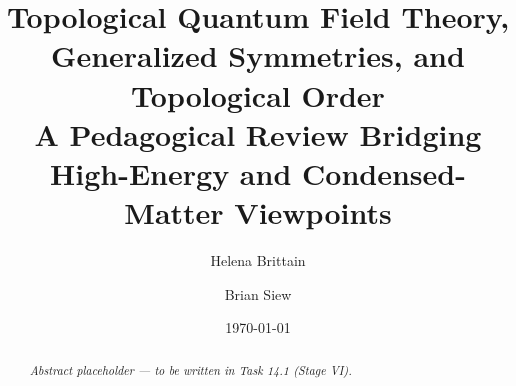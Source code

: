 \documentclass[11pt]{report}
\title{Topological Quantum Field Theory, Generalized Symmetries, and Topological Order\\
{\large A Pedagogical Review Bridging High-Energy and Condensed-Matter Viewpoints}}
\author{Helena Brittain \and Brian Siew}
\date{\today}
\begin{document}
\maketitle

\begin{abstract}
\emph{Abstract placeholder --- to be written in Task 14.1 (Stage VI).}
\end{abstract}

\tableofcontents




















\appendix









\end{document}
